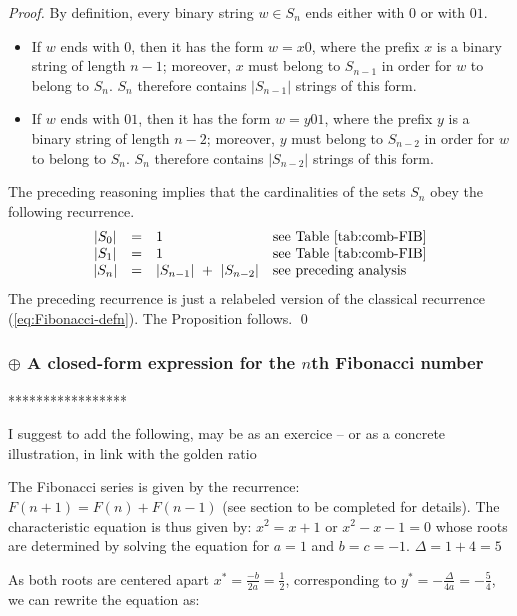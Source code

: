 \begin{proof}
By definition, every binary string $w \in S_n$ ends either with $0$ or
with $01$.
\begin{itemize}
\item
If $w$ ends with $0$, then it has the form $w = x0$, where the prefix
$x$ is a binary string of length $n-1$; moreover, $x$ must belong to
$S_{n-1}$ in order for $w$ to belong to $S_n$.  $S_n$ therefore
contains $|S_{n-1}|$ strings of this form.

\item
If $w$ ends with $01$, then it has the form $w = y01$, where the
prefix $y$ is a binary string of length $n-2$; moreover, $y$ must
belong to $S_{n-2}$ in order for $w$ to belong to $S_n$.  $S_n$
therefore contains $|S_{n-2}|$ strings of this form.
\end{itemize}

The preceding reasoning implies that the cardinalities of the sets
$S_n$ obey the following recurrence.
\[
\begin{array}{ccll}
|S_0| & = & 1 & \mbox{see Table~\ref{tab:comb-FIB}} \\
|S_1| & = & 1 & \mbox{see Table~\ref{tab:comb-FIB}} \\
|S_n| & = & |S_{n-1}| \ + \ |S_{n-2}| & \mbox{see preceding analysis}
\end{array}
\]
The preceding recurrence is just a relabeled version of the classical
recurrence (\ref{eq:Fibonacci-defn}).  The Proposition follows.  \qed
\end{proof}



\subsubsection{$\oplus$  A closed-form expression for the $n$th Fibonacci number}
\label{sec:Fib-Golden-Ratio}

*****************

{\Denis I suggest to add the following, may be as an exercice -- or as a concrete illustration, in link with the golden ratio}

The Fibonacci series is given by the recurrence:
$F(n+1) = F(n) + F(n-1)$ (see section {\Denis to be completed} for details).
The characteristic equation is thus given by:
$x^2 = x + 1$ or $x^2 - x - 1 = 0$ whose roots are determined by solving the equation for $a=1$ and $b=c=-1$.
$\Delta = 1+4 = 5$

As both roots are centered apart $x^*=\frac{-b}{2a}= \frac{1}{2}$, corresponding to $y^*= -\frac{\Delta}{4a} = -\frac{5}{4}$, we can rewrite the equation as:

